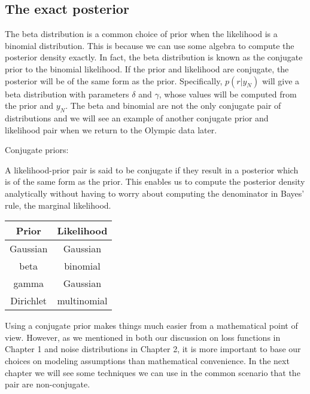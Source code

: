 \subsection{The exact posterior}

The beta distribution is a common choice of prior when the likelihood is a binomial
distribution. This is because we can use some algebra to compute the posterior
density exactly. In fact, the beta distribution is known as the conjugate prior to the
binomial likelihood. If the prior and likelihood are conjugate,
the posterior will be of the same form as the prior. Specifically,
$p(r|y_N)$ will give a
beta distribution with parameters $\delta$ and $\gamma$, whose values will be computed from the
prior and $y_N$. The beta and binomial are not the only conjugate pair of distributions
and we will see an example of another conjugate prior and likelihood pair when we
return to the Olympic data later.

Conjugate priors:

A likelihood-prior pair is said to be
conjugate if they result in a posterior which is of the same form as the prior.
This enables us to compute the posterior density analytically without
having to worry about computing the denominator in Bayes' rule,
the marginal likelihood.

\begin{table}[h]
{\centering
\begin{tabular}{|c|c|}
\hline
Prior & Likelihood \\
\hline
Gaussian & Gaussian \\
beta & binomial \\
gamma & Gaussian \\
Dirichlet & multinomial \\
\hline
\end{tabular}
\par}
\end{table}

Using a conjugate prior makes things much easier from a mathematical point of
view. However, as we mentioned in both our discussion on loss functions in Chapter 1
and noise distributions in Chapter 2, it is more important to base our choices on
modeling assumptions than mathematical convenience. In the next chapter we will see
some techniques we can use in the common scenario that the pair are non-conjugate.

